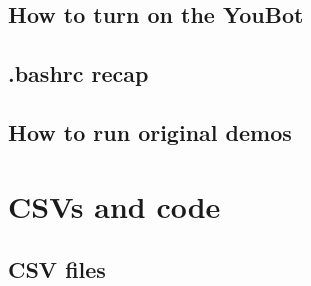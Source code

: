 \documentclass[a4paper, 12pt]{article}
\begin{document}
    \subsection{
     How to turn on the YouBot
    }

    \subsection{.bashrc recap}

    \subsection{How to run original demos}

    \section{CSVs and code}

    \subsection{CSV files}
\end{document}
